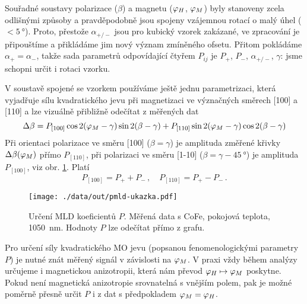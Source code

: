 Souřadné soustavy polarizace ($\beta$) a magnetu ($\varphi_H$, $\varphi_M$) byly stanoveny zcela odlišnými způsoby a pravděpodobně jsou spojeny vzájemnou rotací o malý úhel ($<\SI{5}{\degree}$).
Proto, přestože $\alpha_{+/-}$ jsou pro kubický vzorek zakázané, ve zpracování je připouštíme a přikládáme jim nový význam zmíněného ofsetu.
Přitom pokládáme $\alpha_+ = \alpha_-$, takže sada parametrů odpovídající čtyřem $P_{ij}$ je $P_+$, $P_-$, $\alpha_{+/-}$, $\gamma$: jsme schopni určit i rotaci vzorku.

V soustavě spojené se vzorkem používáme ještě jednu parametrizaci, která vyjadřuje sílu kvadratického jevu při magnetizaci ve význačných směrech [100] a [110] a lze vizuálně přibližně odečítat z měřených dat
\begin{equation}
    \Delta\beta = P_{[100]} \cos 2 (\varphi_M-\gamma) \sin 2(\beta-\gamma) + P_{[110]} \sin 2 (\varphi_M-\gamma) \cos 2(\beta-\gamma)
\end{equation}
Při orientaci polarizace ve směru [100] ($\beta=\gamma$) je amplituda změřené křivky $\Delta\beta(\varphi_M)$ přímo $P_{[110]}$, při polarizaci ve směru [1-10] ($\beta=\gamma-\SI{45}{\degree}$) je amplituda $P_{[100]}$, viz obr. \ref{fig:urceni-MLD-ilustrace}.
Platí
\begin{equation}
    P_{[100]} = P_+ + P_- \,,\quad P_{[110]} = P_+ - P_- \,.
\end{equation}

\begin{figure}[htbp]
    \centering
    \texttt{[image: ./data/out/pmld-ukazka.pdf]}
    \caption{Určení MLD koeficientů $P$. Měřená data s CoFe, pokojová teplota, \SI{1050}{\nano\meter}. Hodnoty $P$ lze odečítat přímo z grafu.}
    \label{fig:urceni-MLD-ilustrace}
\end{figure}

Pro určení síly kvadratického MO jevu (popsanou fenomenologickými parametry $P$) je nutné znát měřený signál v závislosti na $\varphi_M$.
V praxi vždy během analýzy určujeme i magnetickou anizotropii, která nám převod $\varphi_H \mapsto \varphi_M$ poskytne.
Pokud není magnetická anizotropie srovnatelná s vnějším polem, pak je možné poměrně přesně určit $P$ i z dat s předpokladem $\varphi_M=\varphi_H$.

